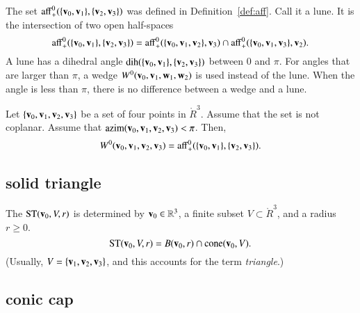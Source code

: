 The set ${\operatorname{aff}}^0_+(\{{\mathbf v}_0,{\mathbf v}_1\},\{{\mathbf v}_2,{\mathbf v}_3\})$ was defined
in Definition~\ref{def:aff}.  Call it a lune.  It is the intersection
of two open half-spaces
    \begin{displaymath}
    {\operatorname{aff}}^0_+(\{{\mathbf v}_0,{\mathbf v}_1\},\{{\mathbf v}_2,{\mathbf v}_3\})
    ={\operatorname{aff}}^0_+(\{{\mathbf v}_0,{\mathbf v}_1,{\mathbf v}_2\},{\mathbf v}_3)\cap
    {\operatorname{aff}}^0_+(\{{\mathbf v}_0,{\mathbf v}_1,{\mathbf v}_3\},{\mathbf v}_2).
        \end{displaymath}
A lune has a dihedral angle $\operatorname{dih}(\{{\mathbf v}_0,{\mathbf v}_1\},\{{\mathbf v}_2,{\mathbf v}_3\})$ between
$0$ and $\pi$.   For angles that are larger than $\pi$,   a wedge
$W^0({\mathbf v}_0,{\mathbf v}_1,{\mathbf w}_1,{\mathbf w}_2)$ is used instead of the lune.  
When the angle is less than $\pi$, there is no difference between
a wedge and a lune.
%
%
%
%
%
%

\begin{lemma} Let $\{{\mathbf v}_0,{\mathbf v}_1,{\mathbf v}_2,{\mathbf v}_3\}$ be a set of four points
in $\ring{R}^3$.  Assume that the set is not coplanar.
Assume that ${\operatorname{azim}}({\mathbf v}_0,{\mathbf v}_1,{\mathbf v}_2,{\mathbf v}_3)<\pi$.
Then,
   \begin{displaymath}W^0({\mathbf v}_0,{\mathbf v}_1,{\mathbf v}_2,{\mathbf v}_3) = {\operatorname{aff}}^0_+(\{{\mathbf v}_0,{\mathbf v}_1\},\{{\mathbf v}_2,{\mathbf v}_3\}).\end{displaymath}
%
\end{lemma}


\subsection{solid triangle}
%

\begin{definition} The  ${\operatorname{ST}}({\mathbf v}_0,V,r)$ is
determined by  ${\mathbf v}_0\in\mathbb{R}^3$, a finite subset $V\subset\ring{R}^3$,
and a radius $r\ge0$. 
    \begin{displaymath}
    {\operatorname{ST}}({\mathbf v}_0,V,r) = 
    B({\mathbf v}_0,r)\cap {\operatorname{cone}}({\mathbf v}_0,V).
    \end{displaymath}
(Usually, $V=\{{\mathbf v}_1,{\mathbf v}_2,{\mathbf v}_3\}$, and this accounts for
the term {\it triangle}.)
%
%
%
\end{definition}



\subsection{conic cap}
%

